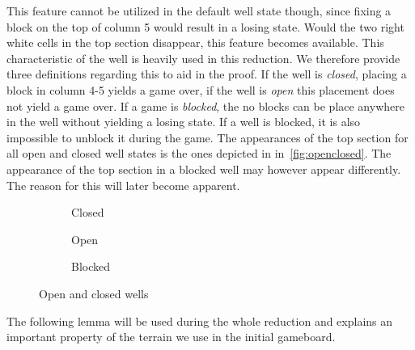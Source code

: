 This feature cannot be utilized in the default well state though, since fixing a block on the top of column 5 would result in a losing state. Would the two right white cells in the top section disappear, this feature becomes available. This characteristic of the well is heavily used in this reduction. We therefore provide three definitions regarding this to aid in the proof. If the well is \textit{closed}, placing a block in column 4-5 yields a game over, if the well is \textit{open} this placement does not yield a game over. If a game is \textit{blocked}, the no blocks can be place anywhere in the well without yielding a losing state. If a well is blocked, it is also impossible to unblock it during the game. The appearances of the top section for all open and closed well states is the ones depicted in in~\autoref{fig:openclosed}. The appearance of the top section in a blocked well may however appear differently. The reason for this will later become apparent.

\begin{figure}[H]
    \centering
    \begin{subfigure}[b]{0.15\linewidth}
        \caption{Closed}
    \end{subfigure}
    \hspace{0.02\linewidth}
    \begin{subfigure}[b]{0.15\linewidth}
        \caption{Open}
    \end{subfigure}
    \hspace{0.02\linewidth}
    \begin{subfigure}[b]{0.15\linewidth}
        \caption{Blocked}
    \end{subfigure}
    \caption{Open and closed wells}
    \label{fig:openclosed}
\end{figure}

The following lemma will be used during the whole reduction and explains an important property of the terrain we use in the initial gameboard.\\

